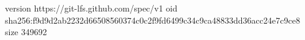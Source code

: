 version https://git-lfs.github.com/spec/v1
oid sha256:f9d9d2ab2232d66508560374c0c2f9fd6499c34c9ca48833dd36acc24e7c9ce8
size 349692
